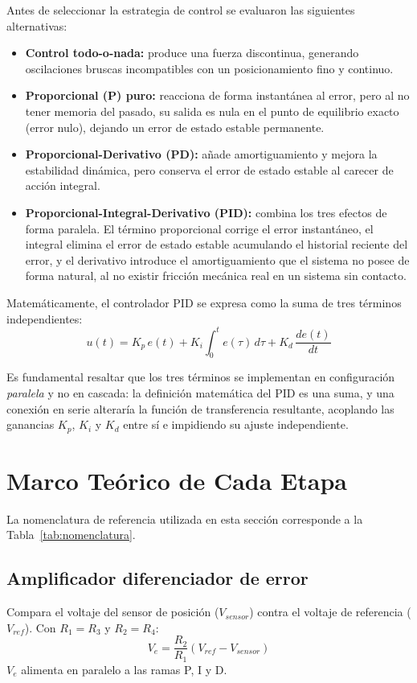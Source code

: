 \documentclass[conference]{IEEEtran}
\begin{document}
Antes de seleccionar la estrategia de control se evaluaron las siguientes alternativas:

\begin{itemize}
\item \textbf{Control todo-o-nada:} produce una fuerza discontinua, generando oscilaciones bruscas incompatibles con un posicionamiento fino y continuo.
\item \textbf{Proporcional (P) puro:} reacciona de forma instantánea al error, pero al no tener memoria del pasado, su salida es nula en el punto de equilibrio exacto (error nulo), dejando un error de estado estable permanente.
\item \textbf{Proporcional-Derivativo (PD):} añade amortiguamiento y mejora la estabilidad dinámica, pero conserva el error de estado estable al carecer de acción integral.
\item \textbf{Proporcional-Integral-Derivativo (PID):} combina los tres efectos de forma paralela. El término proporcional corrige el error instantáneo, el integral elimina el error de estado estable acumulando el historial reciente del error, y el derivativo introduce el amortiguamiento que el sistema no posee de forma natural, al no existir fricción mecánica real en un sistema sin contacto.
\end{itemize}

Matemáticamente, el controlador PID se expresa como la suma de tres términos independientes:
\begin{equation}
u(t) = K_p\,e(t) + K_i\int_0^t e(\tau)\,d\tau + K_d\,\frac{de(t)}{dt}
\label{eq:pid}
\end{equation}

Es fundamental resaltar que los tres términos se implementan en configuración \emph{paralela} y no en cascada: la definición matemática del PID es una suma, y una conexión en serie alteraría la función de transferencia resultante, acoplando las ganancias $K_p$, $K_i$ y $K_d$ entre sí e impidiendo su ajuste independiente.

\section{Marco Teórico de Cada Etapa}

La nomenclatura de referencia utilizada en esta sección corresponde a la Tabla~\ref{tab:nomenclatura}.

\subsection{Amplificador diferenciador de error}
Compara el voltaje del sensor de posición ($V_{sensor}$) contra el voltaje de referencia ($V_{ref}$). Con $R_1=R_3$ y $R_{2}=R_4$:
\begin{equation}
V_e = \frac{R_{2}}{R_1}\left(V_{ref}-V_{sensor}\right)
\label{eq:diff}
\end{equation}
$V_e$ alimenta en paralelo a las ramas P, I y D.
\end{document}
